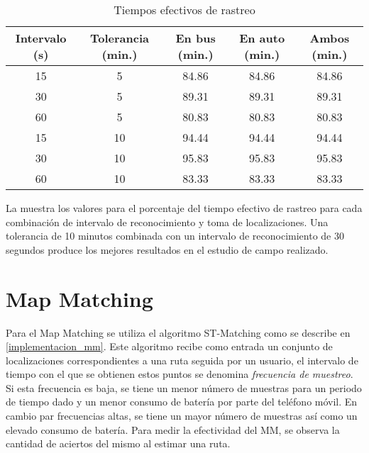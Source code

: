 \begin{table}[h]
  \centering
	\begin{tabular}{ccccc}
	\toprule
	Intervalo (s) & Tolerancia (min.) & En bus (min.) & En auto (min.) & Ambos (min.) \\
	\midrule
	15            & 5                 & 84.86         & 84.86          & 84.86        \\
	30            & 5                 & 89.31         & 89.31          & 89.31        \\
	60            & 5                 & 80.83         & 80.83          & 80.83        \\
	15            & 10                & 94.44         & 94.44          & 94.44        \\
	30            & 10                & 95.83         & 95.83          & 95.83        \\
	60            & 10                & 83.33         & 83.33          & 83.33        \\
	\bottomrule
	\end{tabular}
  \caption{Tiempos efectivos de rastreo}
  \label{tab:prom_tiempo_efectivo_rastreo}
\end{table}

La  muestra los valores para el porcentaje del tiempo efectivo de rastreo para cada combinación de intervalo de reconocimiento y toma de localizaciones. Una tolerancia de 10 minutos combinada con un intervalo de reconocimiento de 30 segundos produce los mejores resultados en el estudio de campo realizado.

\section{Map Matching}

Para el Map Matching se utiliza el algoritmo ST-Matching como se describe en \cref{implementacion_mm}. Este algoritmo recibe como entrada un conjunto de localizaciones correspondientes a una ruta seguida por un usuario, el intervalo de tiempo con el que se obtienen estos puntos se denomina \emph{frecuencia de muestreo}. Si esta frecuencia es baja, se tiene un menor número de muestras para un periodo de tiempo dado y un menor consumo de batería por parte del teléfono móvil. En cambio par frecuencias altas, se tiene un mayor número de muestras así como un elevado consumo de batería. Para medir la efectividad del MM, se observa la cantidad de aciertos del mismo al estimar una ruta.

